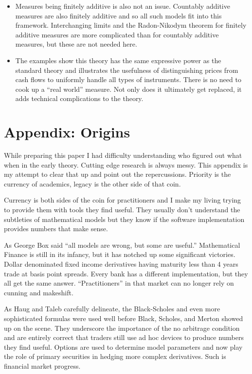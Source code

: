 \documentclass[fleqn]{amsart}
\begin{document}
\begin{itemize}
\item Measures being finitely additive is also not an issue. Countably
additive measures are also finitely additive and so all such
models fit into this framework. Interchanging limits and the Radon-Nikodym 
theorem for finitely additive measures are
more complicated than for countably additive measures, but these are not needed here. 

\item The examples show this theory has the same expressive power as the
standard theory and illustrates the usefulness of distinguishing prices
from cash flows to uniformly handle all types of instruments. 
There is no need to cook up a ``real world'' measure.
Not only does it ultimately get replaced, it adds technical
complications to the theory.

\end{itemize}

\section{Appendix: Origins}
While preparing this paper I had difficulty understanding who figured
out what when in the early theory. Cutting edge research is always messy.
This appendix is my attempt to clear that up and point out the
repercussions. Priority is the currency of academics, legacy
is the other side of that coin.

Currency is both sides of the coin for practitioners and I make my living
trying to provide them with tools they find useful. They usually
don't understand the subtleties of mathematical models but they 
know if the software implementation provides numbers that make sense.

As George Box said ``all models are wrong, but some are useful.''
Mathematical Finance is still in its infancy, but it has notched
up some significant victories. Dollar denominated fixed
income derivatives having maturity less than 4 years trade at
basis point spreads. Every bank has a different implementation,
but they all get the same answer. ``Practitioners'' in that market
can no longer rely on cunning and makeshift.

As Haug and Taleb\cite{HauTal2011} carefully delineate, the Black-Scholes
and even more sophisticated formulas were used well before 
Black, Scholes, and Merton showed up on the scene.
They underscore the importance of the no arbitrage condition
and are entirely correct that traders still
use ad hoc devices to produce numbers they find useful. 
Options are used to
determine model parameters and now play the role of primary securities 
in hedging more complex derivatives. Such is financial market progress.
\end{document}
